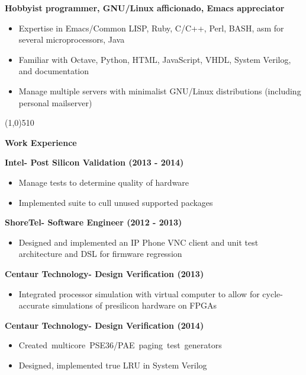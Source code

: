 \documentclass{report}
\newcommand{\cut}{\begin{center} \line(1,0){510} \end{center}}
\begin{document}
\textbf{Hobbyist programmer, GNU/Linux afficionado, Emacs appreciator}
\begin{itemize}
  \renewcommand{\labelitemi}{$\circ$}
\item Expertise in Emacs/Common LISP, Ruby, C/C++, Perl, BASH, asm for several microprocessors, Java
\item Familiar with Octave, Python, HTML, JavaScript, VHDL, System Verilog, and documentation
\item Manage multiple servers with minimalist GNU/Linux distributions (including personal mailserver)
\end{itemize}

\cut{}

\textbf{Work Experience} \\
\begin{paracol}{2}
  \textbf{Intel- Post Silicon Validation (2013 - 2014)}
  \begin{itemize}
    \renewcommand{\labelitemi}{$\circ$}
  \item Manage tests to determine quality of hardware
  \item Implemented suite to cull unused supported packages
  \end{itemize}

  \textbf{ShoreTel- Software Engineer (2012 - 2013)}
  \begin{itemize}
    \renewcommand{\labelitemi}{$\circ$}
  \item Designed and implemented an IP Phone VNC client and unit test architecture and DSL for firmware regression
  \end{itemize}

  \switchcolumn
  \textbf{Centaur Technology- Design Verification (2013)}
  \begin{itemize}
    \renewcommand{\labelitemi}{$\circ$}
  \item Integrated processor simulation with virtual computer to allow
    for cycle-accurate simulations of presilicon hardware on FPGAs
  \end{itemize}

  \textbf{Centaur Technology- Design Verification (2014)}
  \begin{itemize}
    \renewcommand{\labelitemi}{$\circ$}
  \item \mbox{Created multicore PSE36/PAE paging test generators}
  \item Designed, implemented true LRU in System Verilog
  \end{itemize}
\end{paracol}
\end{document}
